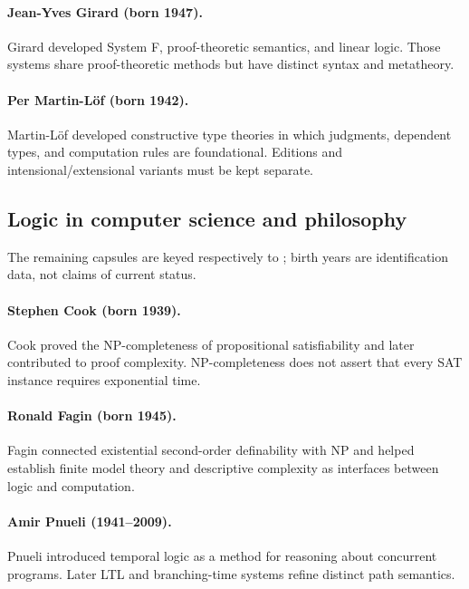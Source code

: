 \paragraph{Jean-Yves Girard (born 1947).}
Girard developed System F, proof-theoretic semantics, and linear logic. Those
systems share proof-theoretic methods but have distinct syntax and metatheory.

\paragraph{Per Martin-L\"of (born 1942).}
Martin-L\"of developed constructive type theories in which judgments,
dependent types, and computation rules are foundational. Editions and
intensional/extensional variants must be kept separate.

\subsection*{Logic in computer science and philosophy}
The remaining capsules are keyed respectively to
\cite{Cook1971,Fagin1974,Pnueli1977,Hoare1969,Dijkstra1975,Scott1972Domains,
Quine1937,Quine1948}; birth years are identification data, not claims of current status.

\paragraph{Stephen Cook (born 1939).}
Cook proved the NP-completeness of propositional satisfiability and later
contributed to proof complexity. NP-completeness does not assert that every SAT
instance requires exponential time.

\paragraph{Ronald Fagin (born 1945).}
Fagin connected existential second-order definability with NP and helped
establish finite model theory and descriptive complexity as interfaces between
logic and computation.

\paragraph{Amir Pnueli (1941--2009).}
Pnueli introduced temporal logic as a method for reasoning about concurrent
programs. Later LTL and branching-time systems refine distinct path semantics.

